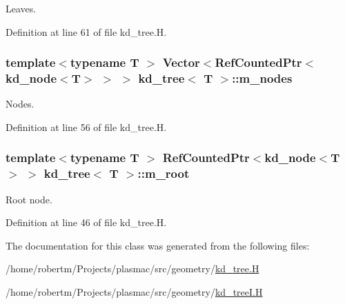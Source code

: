Leaves. 



Definition at line 61 of file kd\+\_\+tree.\+H.

\subsubsection[{\texorpdfstring{m\+\_\+nodes}{m_nodes}}]{\setlength{\rightskip}{0pt plus 5cm}template$<$typename T $>$ Vector$<$Ref\+Counted\+Ptr$<${\bf kd\+\_\+node}$<$T$>$ $>$ $>$ {\bf kd\+\_\+tree}$<$ T $>$\+::m\+\_\+nodes\hspace{0.3cm}{\ttfamily [protected]}}\hypertarget{classkd__tree_a81a614de43db81a4975595c15bb50449}{}\label{classkd__tree_a81a614de43db81a4975595c15bb50449}


Nodes. 



Definition at line 56 of file kd\+\_\+tree.\+H.

\subsubsection[{\texorpdfstring{m\+\_\+root}{m_root}}]{\setlength{\rightskip}{0pt plus 5cm}template$<$typename T $>$ Ref\+Counted\+Ptr$<${\bf kd\+\_\+node}$<$T$>$ $>$ {\bf kd\+\_\+tree}$<$ T $>$\+::m\+\_\+root\hspace{0.3cm}{\ttfamily [protected]}}\hypertarget{classkd__tree_a690081f36464e477e7a670131413e90a}{}\label{classkd__tree_a690081f36464e477e7a670131413e90a}


Root node. 



Definition at line 46 of file kd\+\_\+tree.\+H.



The documentation for this class was generated from the following files\+:\begin{DoxyCompactItemize}
\item 
/home/robertm/\+Projects/plasmac/src/geometry/\hyperlink{kd__tree_8H}{kd\+\_\+tree.\+H}\item 
/home/robertm/\+Projects/plasmac/src/geometry/\hyperlink{kd__treeI_8H}{kd\+\_\+tree\+I.\+H}\end{DoxyCompactItemize}
